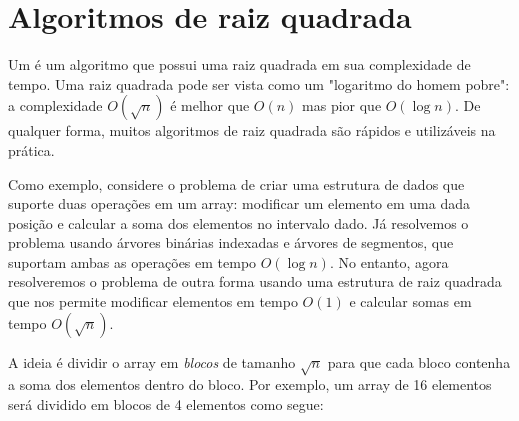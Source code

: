 \chapter{Algoritmos de raiz quadrada}


Um  é um algoritmo
que possui uma raiz quadrada em sua complexidade de tempo.
Uma raiz quadrada pode ser vista como um "logaritmo do homem pobre":
a complexidade $O(\sqrt n)$ é melhor que $O(n)$
mas pior que $O(\log n)$.
De qualquer forma, muitos algoritmos de raiz quadrada são rápidos e utilizáveis na prática.

Como exemplo, considere o problema de
criar uma estrutura de dados que suporte
duas operações em um array:
modificar um elemento em uma dada posição
e calcular a soma dos elementos no intervalo dado.
Já resolvemos o problema usando
árvores binárias indexadas e árvores de segmentos,
que suportam ambas as operações em tempo $O(\log n)$.
No entanto, agora resolveremos o problema
de outra forma usando uma estrutura de raiz quadrada
que nos permite modificar elementos em tempo $O(1)$
e calcular somas em tempo $O(\sqrt n)$.

A ideia é dividir o array em \emph{blocos}
de tamanho $\sqrt n$ para que cada bloco contenha
a soma dos elementos dentro do bloco.
Por exemplo, um array de 16 elementos será
dividido em blocos de 4 elementos como segue:

\begin{center}
\end{center}

